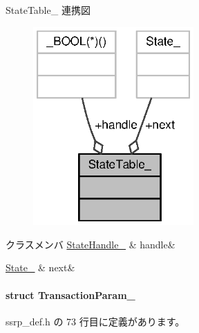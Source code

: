 State\+Table\+\_\+ 連携図\nopagebreak
\begin{figure}[H]
\begin{center}
\leavevmode
\includegraphics[width=174pt]{d9/d5c/structStateTable____coll__graph}
\end{center}
\end{figure}
\begin{DoxyFields}{クラスメンバ}
\hyperlink{ssrp__def_8h_ac695a0ebfafafd2768e9c88bfd43f100_ac695a0ebfafafd2768e9c88bfd43f100}{State\+Handle\+\_\+}\label{ssrp__def_8h_a53065e06f3305cdbf9a94c5dfafa88d8}
&
handle&
\\
\hline

\hyperlink{ssrp__def_8h_a98b969cbcea8731d863416b2a2330c70_a98b969cbcea8731d863416b2a2330c70}{State\+\_\+}\label{ssrp__def_8h_ab157af8617cabc7193b3a2fdde33a637}
&
next&
\\
\hline

\end{DoxyFields}
\label{structTransactionParam__}
\paragraph{struct Transaction\+Param\+\_\+}


 ssrp\+\_\+def.\+h の 73 行目に定義があります。



